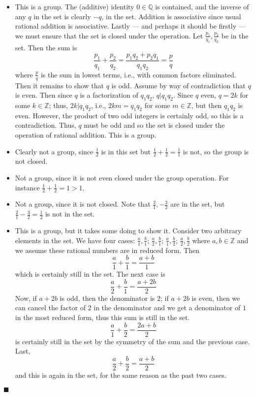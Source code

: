 \documentclass[12pt]{article}
\renewcommand{\qed}{\hfill$\blacksquare$}
\renewenvironment{proof}{\begin{addmargin}[1em]{0em}\begin{newproof}}{\end{newproof}\end{addmargin}\qed}
\begin{document}
\begin{proof}
\begin{itemize}
    \item This is a group. The (additive) identity $0\in \mathbb{Q}$ is contained, and the inverse of any $q$ in the set is clearly $-q$, in the set. Addition is associative since usual rational addition is associative. Lastly --- and perhaps it should be firstly --- we must ensure that the set is closed under the operation. Let $\frac{p_1}{q_1}, \frac{p_2}{q_2}$ be in the set. Then the sum is
    $$ \frac{p_1}{q_1}+\frac{p_2}{q_2} = \frac{p_1q_2+p_2q_1}{q_1q_2} = \frac{p}{q} $$ where $\frac{p}{q}$ is the sum in lowest terms, i.e., with common factors eliminated. Then it remains to show that $q$ is odd. Assume by way of contradiction that $q$ is even. Then since $q$ is a factorization of $q_1q_2$, $q|q_1q_2$. Since $q$ even, $q=2k$ for some $k\in \mathbb{Z}$; thus, $2k | q_1q_2$, i.e., $2km = q_1q_2$ for some $m\in \mathbb{Z}$, but then $q_1q_2$ is even. However, the product of two odd integers is certainly odd, so this is a contradiction. Thus, $q$ must be odd and so the set is closed under the operation of rational addition. This is a group.
    \item Clearly not a group, since $\frac{1}{2}$ is in this set but $\frac{1}{2}+\frac{1}{2}=\frac{1}{1}$ is not, so the group is not closed.
    \item Not a group, since it is not even closed under the group operation. For instance $\frac{1}{2}+\frac{1}{2} = 1 > 1$.
    \item Not a group, since it is not closed. Note that $\frac{2}{1},-\frac{3}{2}$ are in the set, but $\frac{2}{1}-\frac{3}{2}=\frac{1}{2}$ is not in the set.
    \item This is a group, but it takes some doing to show it. Consider two arbitrary elements in the set. We have four cases: $\frac{a}{1}, \frac{b}{1}$; $\frac{a}{2},\frac{b}{1}$; $\frac{a}{1},\frac{b}{2}$; $\frac{a}{2},\frac{b}{2}$ where $a,b \in \mathbb{Z}$ and we assume these rational numbers are in reduced form. Then
    $$ \frac{a}{1}+\frac{b}{1} = \frac{a+b}{1} $$ which is certainly still in the set. The next case is $$ \frac{a}{2}+\frac{b}{1} = \frac{a+2b}{2} $$ Now, if $a+2b$ is odd, then the denominator is $2$; if $a+2b$ is even, then we can cancel the factor of $2$ in the denominator and we get a denominator of $1$ in the most reduced form, thus this sum is still in the set. $$ \frac{a}{1}+\frac{b}{2} = \frac{2a+b}{2}$$ is certainly still in the set by the symmetry of the sum and the previous case. Last, $$\frac{a}{2}+\frac{b}{2}=\frac{a+b}{2}$$ and this is again in the set, for the same reason as the past two cases.

\end{itemize}
\end{proof}
\end{document}
